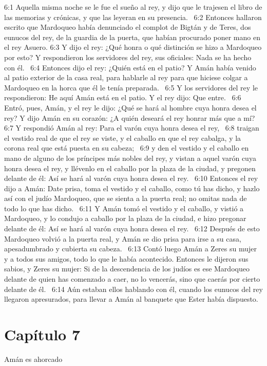 6:1 Aquella misma noche se le fue el sueño al rey, y dijo que le trajesen el libro de las memorias y crónicas, y que las leyeran en su presencia.  
6:2 Entonces hallaron escrito que Mardoqueo había denunciado el complot de Bigtán y de Teres, dos eunucos del rey, de la guardia de la puerta, que habían procurado poner mano en el rey Asuero. 
6:3 Y dijo el rey: ¿Qué honra o qué distinción se hizo a Mardoqueo por esto? Y respondieron los servidores del rey, sus oficiales: Nada se ha hecho con él.  
6:4 Entonces dijo el rey: ¿Quién está en el patio? Y Amán había venido al patio exterior de la casa real, para hablarle al rey para que hiciese colgar a Mardoqueo en la horca que él le tenía preparada.  
6:5 Y los servidores del rey le respondieron: He aquí Amán está en el patio. Y el rey dijo: Que entre.  
6:6 Entró, pues, Amán, y el rey le dijo: ¿Qué se hará al hombre cuya honra desea el rey? Y dijo Amán en su corazón: ¿A quién deseará el rey honrar más que a mí?  
6:7 Y respondió Amán al rey: Para el varón cuya honra desea el rey,  
6:8 traigan el vestido real de que el rey se viste, y el caballo en que el rey cabalga, y la corona real que está puesta en su cabeza;  
6:9 y den el vestido y el caballo en mano de alguno de los príncipes más nobles del rey, y vistan a aquel varón cuya honra desea el rey, y llévenlo en el caballo por la plaza de la ciudad, y pregonen delante de él: Así se hará al varón cuya honra desea el rey.  
6:10 Entonces el rey dijo a Amán: Date prisa, toma el vestido y el caballo, como tú has dicho, y hazlo así con el judío Mardoqueo, que se sienta a la puerta real; no omitas nada de todo lo que has dicho.  
6:11 Y Amán tomó el vestido y el caballo, y vistió a Mardoqueo, y lo condujo a caballo por la plaza de la ciudad, e hizo pregonar delante de él: Así se hará al varón cuya honra desea el rey.  
6:12 Después de esto Mardoqueo volvió a la puerta real, y Amán se dio prisa para irse a su casa, apesadumbrado y cubierta su cabeza.  
6:13 Contó luego Amán a Zeres su mujer y a todos sus amigos, todo lo que le había acontecido. Entonces le dijeron sus sabios, y Zeres su mujer: Si de la descendencia de los judíos es ese Mardoqueo delante de quien has comenzado a caer, no lo vencerás, sino que caerás por cierto delante de él.  
6:14 Aún estaban ellos hablando con él, cuando los eunucos del rey llegaron apresurados, para llevar a Amán al banquete que Ester había dispuesto.  
\section*{Capítulo 7 }
Amán es ahorcado  

